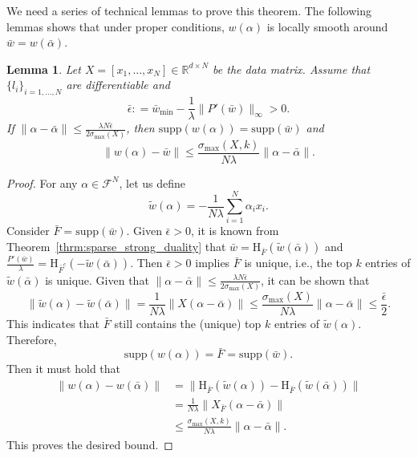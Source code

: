 \documentclass[11pt]{article}
\newtheorem{lemma}{Lemma}
\newcommand{\supp}{\text{supp}}
\numberwithin{equation}{section}
\numberwithin{table}{section}
\numberwithin{figure}{section}
\begin{document}
We need a series of technical lemmas to prove this theorem. The following lemmas shows that under proper conditions, $w(\alpha)$ is locally smooth around $\bar w = w(\bar \alpha)$.
\begin{lemma}\label{lemma:uniqueness_gap}
Let $X=[x_1,...,x_N]\in \mathbb{R}^{d\times N}$ be the data matrix. Assume that $\{l_i\}_{i=1,...,N}$ are differentiable and
\[
\bar\epsilon: = \bar w_{\min} - \frac{1}{\lambda} \|P'(\bar w)\|_\infty >0.
\]
If $\|\alpha - \bar\alpha\| \le \frac{\lambda N\bar\epsilon}{2\sigma_{\max}(X)} $, then $\supp(w(\alpha))=\supp(\bar w)$ and
\[
\|w(\alpha) - \bar w\| \le \frac{\sigma_{\max}(X,k)}{N\lambda}\|\alpha - \bar\alpha\|.
\]
\end{lemma}
\begin{proof}
For any $\alpha \in \mathcal{F}^N$, let us define
\[
\tilde w(\alpha) = -\frac{1}{N\lambda} \sum_{i=1}^N \alpha_i x_i.
\]
Consider $\bar F = \supp(\bar w)$. Given $\bar\epsilon >0$, it is known from Theorem~\ref{thrm:sparse_strong_duality} that $\bar w = \mathrm{H}_{\bar F} \left(\tilde w(\bar\alpha) \right)$ and $\frac{P'(\bar w)}{\lambda} = \mathrm{H}_{\bar F^c} \left(-\tilde w(\bar\alpha) \right)$. Then $\bar\epsilon >0$ implies $\bar F$ is unique, i.e., the top $k$ entries of $\tilde w(\bar\alpha)$ is unique. Given that $\|\alpha - \bar\alpha\| \le \frac{\lambda N\bar\epsilon}{2\sigma_{\max}(X)} $, it can be shown that
\[
\|\tilde w(\alpha) - \tilde w(\bar\alpha)\| = \frac{1}{N\lambda}\|X(\alpha - \bar\alpha)\| \le\frac{\sigma_{\max}(X)}{N\lambda} \|\alpha - \bar\alpha\| \le \frac{\bar\epsilon}{2}.
\]
This indicates that $\bar F$ still contains the (unique) top $k$ entries of $\tilde w(\alpha)$. Therefore,
\[
\supp(w(\alpha)) = \bar F = \supp(\bar w).
\]
Then it must hold that
\[
\begin{aligned}
\|w(\alpha) - w(\bar\alpha)\|  & =\|\mathrm{H}_{\bar F} \left(\tilde w(\alpha) \right) - \mathrm{H}_{\bar F} \left(\tilde w(\bar\alpha)\right)\| \\
&= \frac{1}{N\lambda}\|X_{\bar F}(\alpha - \bar\alpha)\| \\
&\le\frac{\sigma_{\max}(X, k)}{N\lambda} \|\alpha - \bar\alpha\|.
\end{aligned}
\]
This proves the desired bound.
\end{proof}
\end{document}
